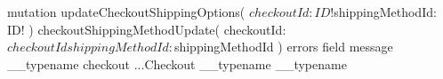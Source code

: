 \documentclass{article}
\begin{document}
\begin{gql}
mutation updateCheckoutShippingOptions(
  $checkoutId: ID!
  $shippingMethodId: ID!
) {
  checkoutShippingMethodUpdate(
    checkoutId: $checkoutId
    shippingMethodId: $shippingMethodId
  ) {
    errors {
      field
      message
      __typename
    }
    checkout {
      ...Checkout
      __typename
    }
    __typename
  }
}
\end{gql}
\end{document}
